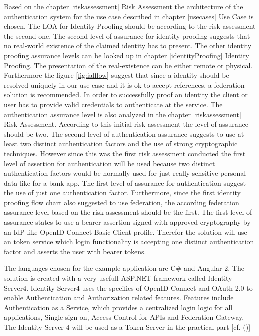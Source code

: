 Based on the chapter \ref{riskassessment} Risk Assessment the architecture of the authentication system for the use case described in chapter \ref{usecases} Use Case is chosen. The LOA for Identity Proofing should be according to the risk assessment the second one. The second level of assurance for identity proofing suggests that no real-world existence of the claimed identity has to present. The other identity proofing assurance levels can be looked up in chapter \ref{identityProofing} Identity Proofing. The presentation of the real-existence can be either remote or physical. Furthermore the figure \ref{fig:ialflow} suggest that since a identity should be resolved uniquely in our use case and it is ok to accept references, a federation solution is recommended. In order to successfully proof an identity the client or user has to provide valid credentials to authenticate at the service. The  authentication assurance level is also analyzed in the chapter \ref{riskassessment} Risk Assessment. According to this initial risk assessment the level of assurance should be two. The second level of authentication assurance suggests to use at least two distinct authentication factors and the use of strong cryptographic techniques. However since this was the first risk assessment conducted the first level of assertion for authentication will be used because two distinct authentication factors would be normally used for just really sensitive personal data like for a bank app. The first level of assurance for authentication suggest the use of just one authentication factor. Furthermore, since the first identity proofing flow chart also suggested to use federation, the according federation assurance level based on the risk assessment should be the first. The first level of assurance states to use a bearer assertion signed with approved cryptography by an IdP like OpenID Connect Basic Client profile. Therefor the solution will use an token service which login functionality is  accepting one distinct authentication factor and asserts the user with bearer tokens. 


The languages chosen for the example application are C\# and Angular 2. The solution is created with a very usefull ASP.NET framework called Identity Server4. Identity Server4 uses the specifics of OpenID Connect and OAuth 2.0 to enable Authentication and Authorization related features. Features include Authentication as a Service, which provides a centralized login logic for all applications, Single sign-on, Access Control for APIs and Federation Gateway. The Identity Server 4 will be used as a Token Server in the practical part [cf. (\cite{Brock:2018:ID4})]

